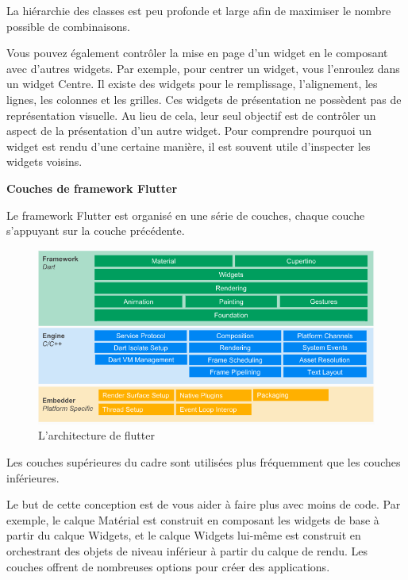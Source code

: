 La hiérarchie des classes est peu profonde et large afin de maximiser le nombre possible de combinaisons.\medskip

Vous pouvez également contrôler la mise en page d'un widget en le composant avec d'autres widgets. Par exemple, pour centrer un widget, vous l'enroulez dans un widget Centre. Il existe des widgets pour le remplissage, l'alignement, les lignes, les colonnes et les grilles. Ces widgets de présentation ne possèdent pas de représentation visuelle. Au lieu de cela, leur seul objectif est de contrôler un aspect de la présentation d’un autre widget. Pour comprendre pourquoi un widget est rendu d’une certaine manière, il est souvent utile d’inspecter les widgets voisins.\bigskip

\longtab \textbf{Couches de framework Flutter\medskip}

Le framework Flutter est organisé en une série de couches, chaque couche s'appuyant sur la couche précédente.\medskip

\begin{figure}[h]
	\begin{center}
		\includegraphics[width=13cm]{Images/chapter2/flutter_architecture.png}
		\caption{{\footnotesize L'architecture de flutter\cite{noauthor_technical_nodate}}}
	\end{center}
\end{figure}

Les couches supérieures du cadre sont utilisées plus fréquemment que les couches inférieures.\medskip

Le but de cette conception est de vous aider à faire plus avec moins de code. Par exemple, le calque Matérial est construit en composant les widgets de base à partir du calque Widgets, et le calque Widgets lui-même est construit en orchestrant des objets de niveau inférieur à partir du calque de rendu.
Les couches offrent de nombreuses options pour créer des applications.

